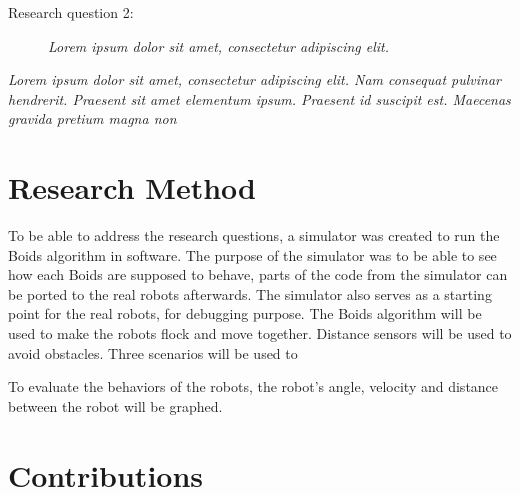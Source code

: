 \begin{description}
\item[Research question 2:] {\it Lorem ipsum dolor sit amet, consectetur adipiscing elit.}
\end{description}

{\it Lorem ipsum dolor sit amet, consectetur adipiscing elit. Nam consequat pulvinar hendrerit. Praesent sit amet elementum ipsum. Praesent id suscipit est. Maecenas gravida pretium magna non }

\section{Research Method}
\label{sec:researchMethod}
To be able to address the research questions, a simulator was created to run the Boids algorithm in software. The purpose of the simulator was to be able to see how each Boids are supposed to behave, parts of the code from the simulator can be ported to the real robots afterwards. The simulator also serves as a starting point for the real robots, for debugging purpose.
The Boids algorithm will be used to make the robots flock and move together. Distance sensors will be used to avoid obstacles.
Three scenarios will be used to 

To evaluate the behaviors of the robots, the robot's angle, velocity and distance between the robot will be graphed. 

\section{Contributions}
\label{sec:IntroContributions}



